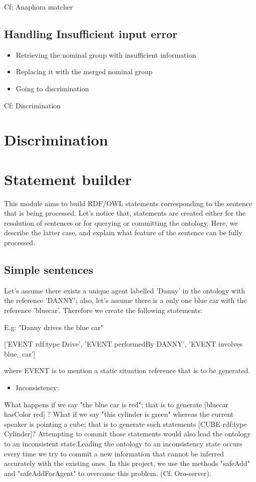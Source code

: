 \documentclass[twoside,a4paper,10pt]{report}
\newcommand{\dokutitleleveltwo}[1]{\section{#1}}
\newcommand{\dokutitleleveltree}[1]{\subsection{#1}}
\newcommand{\dokufootmark}[1]{\footnotemark[#1]}
\begin{document}
Cf: Anaphora matcher


\dokutitleleveltree{Handling Insufficient input error}
\label{a9b6979d4ccc758341445731028f7332}%
\begin{itemize}
\item  Retrieving the nominal group with insufficient information
\item  Replacing it with the merged nominal group
\item  Going to discrimination
\end{itemize}


Cf: Discrimination


\dokutitleleveltwo{Discrimination}
\label{974418acf6ac4871b739b9591436865a}%

\dokutitleleveltwo{Statement builder}
\label{96858fc1845b81e4956d78bc03e34978}%
This module aims to build RDF\dokufootmark{1}/OWL statements corresponding to the sentence that is being processed. 
Let's notice that, statements are created either for the resolution of sentences or for querying or committing the ontology.
Here, we describe the latter case, and explain what feature of the sentence can be fully processed.


\dokutitleleveltree{Simple sentences}
\label{83df2a31577b0939e5c2d716b7b579fd}%
 
Let's assume there exists a unique agent labelled 'Danny' in the ontology with the reference 'DANNY'; also, let's assume there is a only one blue car with the reference 'blue{\textunderscore}car'. Therefore we create the following statements:



\small
\begin{verbatimtab}
  E.g:
  "Danny drives the blue car"
  
  ['EVENT rdf:type Drive',
  'EVENT performedBy DANNY',
  'EVENT involves blue_car']
  
  where EVENT is to mention a static situation reference that is to be generated.
\end{verbatimtab}
\normalsize
\begin{itemize}
\item  Inconsistency:
\end{itemize}

What happens if we say "the blue car is red"; that is to generate [blue{\textunderscore}car hasColor red] ?
What if we say "this cylinder is green" whereas the current speaker is pointing a cube; that is to generate such statements [CUBE rdf:type Cylinder]?
Attempting to commit those statements would also lead the ontology to an inconsistent state.Leading the ontology to an inconsistency state occurs every time we try to commit a new information that cannot be inferred accurately with the existing ones.
In this project, we use the methods "safeAdd" and "safeAddForAgent" to overcome this problem. (Cf. Oro-server).
\end{document}
